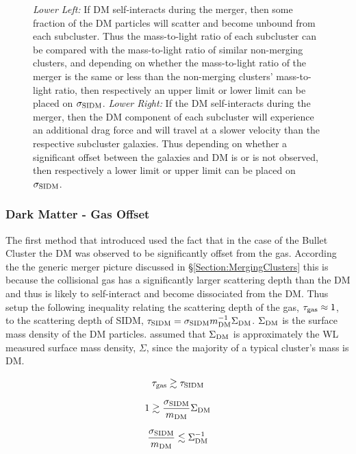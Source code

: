 \begin{figure}
{\emph{Lower Left:} If DM self-interacts during the merger, then some fraction of the DM particles will scatter and become unbound from each subcluster.
Thus the mass-to-light ratio of each subcluster can be compared with the mass-to-light ratio of similar non-merging clusters, and depending on whether the mass-to-light ratio of the merger is the same or less than the non-merging clusters' mass-to-light ratio, then respectively an upper limit or lower limit can be placed on $\sigma_{\rm SIDM}$.
\emph{Lower Right:} If the DM self-interacts during the merger, then the DM component of each subcluster will experience an additional drag force and will travel at a slower velocity than the respective subcluster galaxies.
Thus depending on whether a significant offset between the galaxies and DM is or is not observed, then respectively a lower limit or upper limit can be placed on $\sigma_{\rm SIDM}$.
\label{fig:4ConstraintMethods}}
\end{figure}

\subsubsection{Dark Matter - Gas Offset}
The first method that \citet{Markevitch:2004dl} introduced used the fact that in the case of the Bullet Cluster the DM was observed to be significantly offset from the gas.
According the the generic merger picture discussed in \S \ref{Section:MergingClusters} this is because the collisional gas has a significantly larger scattering depth than the DM and thus is likely to self-interact and become dissociated from the DM.
Thus \citet{Markevitch:2004dl} setup the following inequality relating the scattering depth of the gas, $\tau_{\rm gas}\approx 1$, to the scattering depth of SIDM, $\tau_{\rm SIDM}=\sigma_{\rm SIDM}m^{-1}_{\rm DM} \Sigma_{\rm DM}$.
$\Sigma_{\rm DM}$ is the surface mass density of the DM particles.
\citet{Markevitch:2004dl} assumed that $\Sigma_{\rm DM}$ is approximately the WL measured surface mass density, $\Sigma$, since the majority of a typical cluster's mass is DM.

\begin{displaymath}
\tau_{\rm gas} \gtrsim \tau_{\rm SIDM}
\end{displaymath}

\begin{displaymath}
1 \gtrsim \frac{\sigma_{\rm SIDM}}{m_{\rm DM}} \Sigma_{\rm DM}
\end{displaymath}

\begin{equation}\label{equation:scatterdepth}
\frac{\sigma_{\rm SIDM}}{m_{\rm DM}} \lesssim \Sigma_{\rm DM}^{-1}
\end{equation}

